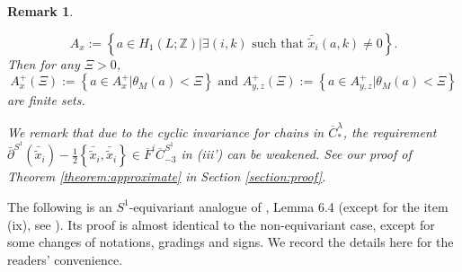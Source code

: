 \documentclass[a4paper]{article}
\newtheorem{remark}[theorem]{Remark}
\numberwithin{equation}{section}
\begin{document}
\begin{remark}
\begin{itemize}
	\begin{equation}
	A_x:=\left\{a\in H_1(L;\mathbb{Z})\vert\exists(i,k)\textrm{ such that }\bar{\tilde{x}}_i(a,k)\neq0\right\}.
	\end{equation}
	Then for any $\Xi>0$,
	\begin{equation}
	A_x^+(\Xi):=\left\{a\in A_x^+\vert\theta_M(a)<\Xi\right\}\textrm{ and }A_{y,z}^+(\Xi):=\left\{a\in A_{y,z}^+\vert\theta_M(a)<\Xi\right\}
	\end{equation}
	are finite sets.
\end{itemize}
We remark that due to the cyclic invariance for chains in $\overline{C}_\ast^\lambda$, the requirement $\bar{\partial}^{S^1}(\bar{\tilde{x}}_i)-\frac{1}{2}\left\{\bar{\tilde{x}}_i,\bar{\tilde{x}}_i\right\}\in \overline{F}^i\overline{C}_{-3}^{S^1}$ in (iii') can be weakened. See our proof of Theorem \ref{theorem:approximate} in Section \ref{section:proof}.
\end{remark}

The following is an $S^1$-equivariant analogue of \cite{ki2}, Lemma 6.4 (except for the item (ix), see \cite{ki3}). Its proof is almost identical to the non-equivariant case, except for some changes of notations, gradings and signs. We record the details here for the readers' convenience.
\end{document}
